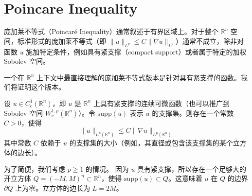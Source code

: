 \section{Poincare Inequality}

庞加莱不等式（Poincaré Inequality）通常叙述于有界区域上。对于整个 $\mathbb{R}^n$ 空间，标准形式的庞加莱不等式（即 $\|u\|_{L^p} \le C \|\nabla u\|_{L^p}$）通常不成立，除非对函数 $u$ 施加特定条件，例如具有紧支撑（compact support）或者属于特定的加权 Sobolev 空间。

一个在 $\mathbb{R}^n$ 上下文中最直接理解的庞加莱不等式版本是针对具有紧支撑的函数。我们将证明这个版本。

\begin{theorem}
设 $u \in C_c^1(\mathbb{R}^n)$，即 $u$ 是 $\mathbb{R}^n$ 上具有紧支撑的连续可微函数（也可以推广到 Sobolev 空间 $W_c^{1,p}(\mathbb{R}^n)$）。令 $\text{supp}(u)$ 表示 $u$ 的支撑集。则存在一个常数 $C > 0$，使得
\[
\|u\|_{L^p(\mathbb{R}^n)} \le C \|\nabla u\|_{L^p(\mathbb{R}^n)}
\]
其中常数 $C$ 依赖于 $u$ 的支撑集的大小（例如，其直径或包含该支撑集的某个立方体的边长）。
\end{theorem}
为了简便，我们考虑 $p \ge 1$ 的情况。
因为 $u$ 具有紧支撑，所以存在一个足够大的开立方体 $Q = (-M, M)^n \subset \mathbb{R}^n$，使得 $\text{supp}(u) \subset Q$。这意味着 $u$ 在 $Q$ 的边界 $\partial Q$ 上为零。立方体的边长为 $L=2M$。

